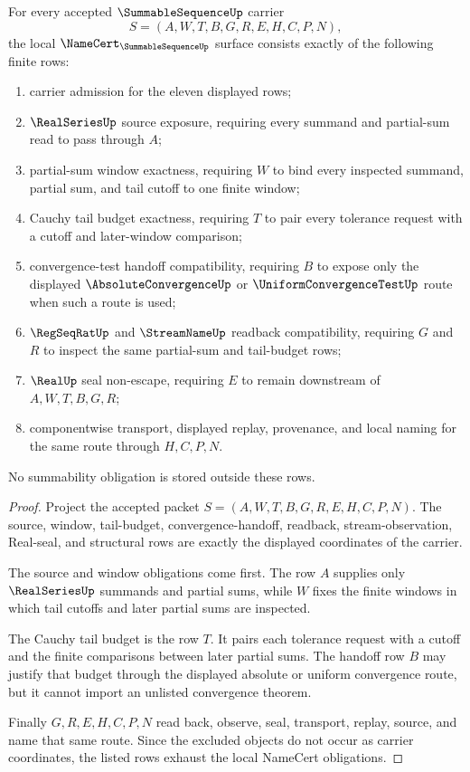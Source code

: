 \begin{theorem}
\label{thm:summable-sequence-namecert-obligations}
For every accepted $\SummableSequenceUp$ carrier
$$
S=(A,W,T,B,G,R,E,H,C,P,N),
$$
the local $\NameCert_{\SummableSequenceUp}$ surface consists exactly of the following finite rows:
\begin{enumerate}
\item carrier admission for the eleven displayed rows;
\item $\RealSeriesUp$ source exposure, requiring every summand and partial-sum read to pass through $A$;
\item partial-sum window exactness, requiring $W$ to bind every inspected summand, partial sum, and tail cutoff to one finite window;
\item Cauchy tail budget exactness, requiring $T$ to pair every tolerance request with a cutoff and later-window comparison;
\item convergence-test handoff compatibility, requiring $B$ to expose only the displayed $\AbsoluteConvergenceUp$ or $\UniformConvergenceTestUp$ route when such a route is used;
\item $\RegSeqRatUp$ and $\StreamNameUp$ readback compatibility, requiring $G$ and $R$ to inspect the same partial-sum and tail-budget rows;
\item $\RealUp$ seal non-escape, requiring $E$ to remain downstream of $A,W,T,B,G,R$;
\item componentwise transport, displayed replay, provenance, and local naming for the same route through $H,C,P,N$.
\end{enumerate}
No summability obligation is stored outside these rows.
\end{theorem}
\begin{proof}
Project the accepted packet $S=(A,W,T,B,G,R,E,H,C,P,N)$. The source, window, tail-budget, convergence-handoff, readback, stream-observation, Real-seal, and structural rows are exactly the displayed coordinates of the carrier.

The source and window obligations come first. The row $A$ supplies only $\RealSeriesUp$ summands and partial sums, while $W$ fixes the finite windows in which tail cutoffs and later partial sums are inspected.

The Cauchy tail budget is the row $T$. It pairs each tolerance request with a cutoff and the finite comparisons between later partial sums. The handoff row $B$ may justify that budget through the displayed absolute or uniform convergence route, but it cannot import an unlisted convergence theorem.

Finally $G,R,E,H,C,P,N$ read back, observe, seal, transport, replay, source, and name that same route. Since the excluded objects do not occur as carrier coordinates, the listed rows exhaust the local NameCert obligations.
\end{proof}

